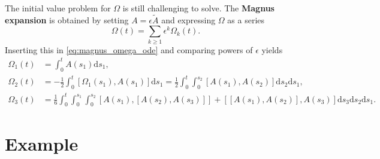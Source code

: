 The initial value problem for $\Omega$ is still challenging to solve. The \textbf{Magnus expansion} is obtained by setting $A = \epsilon \tilde A$ and expressing $\Omega$ as a series
\begin{equation}
  \Omega(t) = \sum_{k \geq 1} \epsilon^k \Omega_k(t).
\end{equation}
Inserting this in \eqref{eq:magnus_omega_ode} and comparing powers of $\epsilon$ yields
\begin{equation}
  \begin{aligned}
    \Omega_1(t) & = \int_0^t A(s_1) \mathrm{d}s_1,                                                                                                                                                                                 \\
    \Omega_2(t) & = -\frac{1}{2} \int_0^t \left[ \Omega_1(s_1), A(s_1) \right] \mathrm{d}s_1 = \frac{1}{2} \int_0^t \int_{0}^{s_2} \left[ A(s_1), A(s_2) \right] \mathrm{d} s_2 \mathrm{d} s_1,                                    \\
    \Omega_3(t) & = \frac{1}{6} \int_{0}^t \int_{0}^{s_1} \int_{0}^{s_2} \left[ A(s_1), \left[ A(s_2), A(s_3) \right] \right] + \left[ \left[ A(s_1), A(s_2) \right], A(s_3) \right] \mathrm{d} s_3 \mathrm{d} s_2 \mathrm{d} s_1.
  \end{aligned}
\end{equation}


\section{Example}


